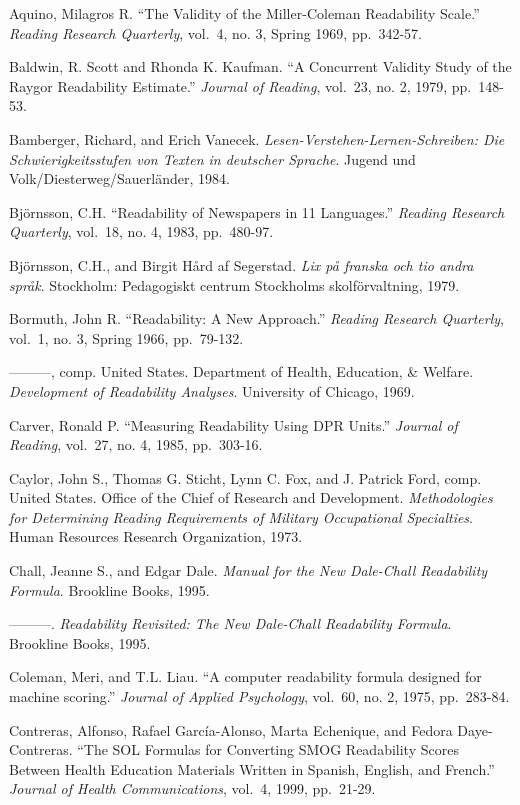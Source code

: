 \documentclass[
]{book}
\theoremstyle{definition}
\theoremstyle{definition}
\theoremstyle{definition}
\theoremstyle{definition}
\theoremstyle{remark}
\begin{document}
Aquino, Milagros R. ``The Validity of the Miller-Coleman Readability Scale.'' \emph{Reading Research Quarterly}, vol.~4, no. 3, Spring 1969, pp.~342-57.

Baldwin, R. Scott and Rhonda K. Kaufman. ``A Concurrent Validity Study of the Raygor Readability Estimate.'' \emph{Journal of Reading}, vol.~23, no. 2, 1979, pp.~148-53.

Bamberger, Richard, and Erich Vanecek. \emph{Lesen-Verstehen-Lernen-Schreiben: Die Schwierigkeitsstufen von Texten in deutscher Sprache}. Jugend und Volk/Diesterweg/Sauerländer, 1984.

Björnsson, C.H. ``Readability of Newspapers in 11 Languages.'' \emph{Reading Research Quarterly}, vol.~18, no. 4, 1983, pp.~480-97.

Björnsson, C.H., and Birgit Hård af Segerstad. \emph{Lix på franska och tio andra språk}. Stockholm: Pedagogiskt centrum Stockholms skolförvaltning, 1979.

Bormuth, John R. ``Readability: A New Approach.'' \emph{Reading Research Quarterly}, vol.~1, no. 3, Spring 1966, pp.~79-132.

---------, comp. United States. Department of Health, Education, \& Welfare. \emph{Development of Readability Analyses}. University of Chicago, 1969.

Carver, Ronald P. ``Measuring Readability Using DPR Units.'' \emph{Journal of Reading}, vol.~27, no. 4, 1985, pp.~303-16.

Caylor, John S., Thomas G. Sticht, Lynn C. Fox, and J. Patrick Ford, comp. United States. Office of the Chief of Research and Development. \emph{Methodologies for Determining Reading Requirements of Military Occupational Specialties}. Human Resources Research Organization, 1973.

Chall, Jeanne S., and Edgar Dale. \emph{Manual for the New Dale-Chall Readability Formula}. Brookline Books, 1995.

---------. \emph{Readability Revisited: The New Dale-Chall Readability Formula}. Brookline Books, 1995.

Coleman, Meri, and T.L. Liau. ``A computer readability formula designed for machine scoring.'' \emph{Journal of Applied Psychology}, vol.~60, no. 2, 1975, pp.~283-84.

Contreras, Alfonso, Rafael García-Alonso, Marta Echenique, and Fedora Daye-Contreras. ``The SOL Formulas for Converting SMOG Readability Scores Between Health Education Materials Written in Spanish, English, and French.'' \emph{Journal of Health Communications}, vol.~4, 1999, pp.~21-29.
\end{document}
